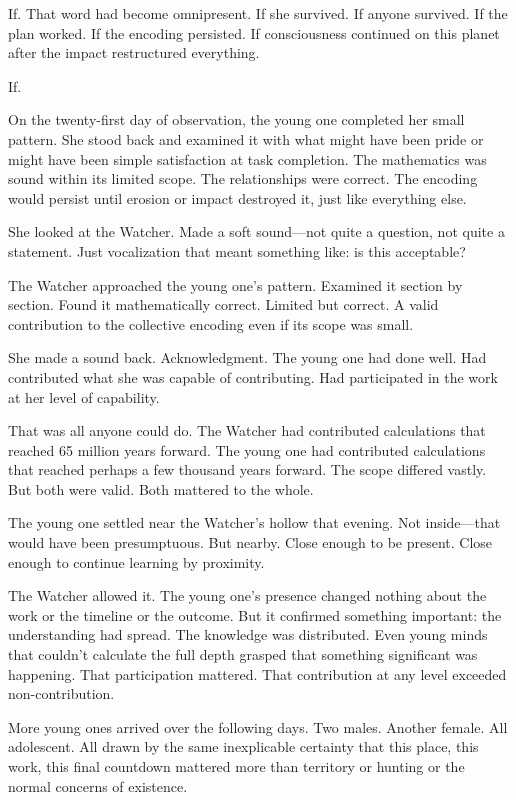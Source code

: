 If. That word had become omnipresent. If she survived. If anyone survived. If the plan worked. If the encoding persisted. If consciousness continued on this planet after the impact restructured everything.

If.

\scenebreak

On the twenty-first day of observation, the young one completed her small pattern. She stood back and examined it with what might have been pride or might have been simple satisfaction at task completion. The mathematics was sound within its limited scope. The relationships were correct. The encoding would persist until erosion or impact destroyed it, just like everything else.

She looked at the Watcher. Made a soft sound—not quite a question, not quite a statement. Just vocalization that meant something like: is this acceptable?

The Watcher approached the young one's pattern. Examined it section by section. Found it mathematically correct. Limited but correct. A valid contribution to the collective encoding even if its scope was small.

She made a sound back. Acknowledgment. The young one had done well. Had contributed what she was capable of contributing. Had participated in the work at her level of capability.

That was all anyone could do. The Watcher had contributed calculations that reached 65 million years forward. The young one had contributed calculations that reached perhaps a few thousand years forward. The scope differed vastly. But both were valid. Both mattered to the whole.

The young one settled near the Watcher's hollow that evening. Not inside—that would have been presumptuous. But nearby. Close enough to be present. Close enough to continue learning by proximity.

The Watcher allowed it. The young one's presence changed nothing about the work or the timeline or the outcome. But it confirmed something important: the understanding had spread. The knowledge was distributed. Even young minds that couldn't calculate the full depth grasped that something significant was happening. That participation mattered. That contribution at any level exceeded non-contribution.

\scenebreak

More young ones arrived over the following days. Two males. Another female. All adolescent. All drawn by the same inexplicable certainty that this place, this work, this final countdown mattered more than territory or hunting or the normal concerns of existence.

